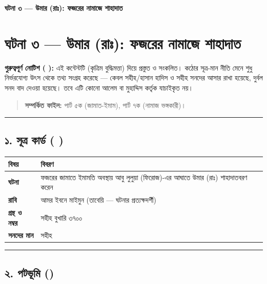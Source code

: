 

\begin{center}{\Large\bfseries\color{emerald} ঘটনা ৩ — উমার (রাঃ): ফজরের নামাজে শাহাদাত}\end{center}
\vspace{1em}
\section*{ঘটনা ৩ — উমার (রাঃ): ফজরের নামাজে শাহাদাত}

\begin{warnbox}
 \textbf{গুরুত্বপূর্ণ নোটিশ ( ):} এই কন্টেন্টটি  (কৃত্রিম বুদ্ধিমত্তা) দিয়ে প্রস্তুত ও সংকলিত।  কঠোর সূত্র-মান নীতি মেনে শুধু নির্ভরযোগ্য উৎস থেকে তথ্য সংগ্রহ করেছে — কেবল সহীহ/হাসান হাদিস ও সহীহ সনদের আসার রাখা হয়েছে, দুর্বল সনদ বাদ দেওয়া হয়েছে। তবে এটি কোনো আলেম বা মুহাদ্দিস কর্তৃক যাচাইকৃত নয়।
\end{warnbox}

\begin{quote}
\textbf{সম্পর্কিত ফাইল:} পার্ট ৫ক (জামাত-ইমাম), পার্ট ৭ক (নামাজ ভঙ্গকারী)।
\end{quote}

\medskip\hrule\medskip

\subsection*{১. সূত্র কার্ড ( )}

\begin{table}[h]\centering\small
\begin{tabular}{ll}
বিষয় & বিবরণ \\
\hline
\textbf{ঘটনা} & ফজরের জামাতে ইমামতি অবস্থায় আবু লুলুয়া (ফিরোজ)-এর আঘাতে উমার (রাঃ) শাহাদাতবরণ করেন \\
\textbf{রাবি} & আমর ইবনে মাইমুন (তাবেয়ি — ঘটনার প্রত্যক্ষদর্শী) \\
\textbf{গ্রন্থ ও নম্বর} & সহীহ বুখারি ৩৭০০ \\
\textbf{সনদের মান} & সহীহ \\
\hline
\end{tabular}
\end{table}

\medskip\hrule\medskip

\subsection*{২. পটভূমি ()}

